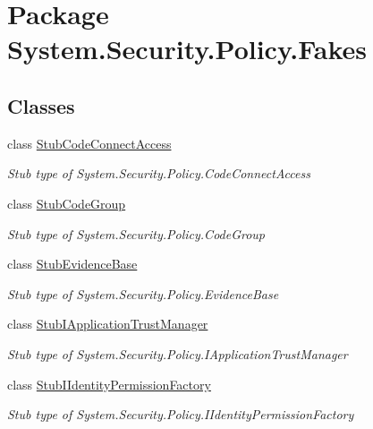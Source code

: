 \hypertarget{namespace_system_1_1_security_1_1_policy_1_1_fakes}{\section{Package System.\-Security.\-Policy.\-Fakes}
\label{namespace_system_1_1_security_1_1_policy_1_1_fakes}
}
\subsection*{Classes}
\begin{DoxyCompactItemize}
\item 
class \hyperlink{class_system_1_1_security_1_1_policy_1_1_fakes_1_1_stub_code_connect_access}{Stub\-Code\-Connect\-Access}
\begin{DoxyCompactList}\small\item\em Stub type of System.\-Security.\-Policy.\-Code\-Connect\-Access\end{DoxyCompactList}\item 
class \hyperlink{class_system_1_1_security_1_1_policy_1_1_fakes_1_1_stub_code_group}{Stub\-Code\-Group}
\begin{DoxyCompactList}\small\item\em Stub type of System.\-Security.\-Policy.\-Code\-Group\end{DoxyCompactList}\item 
class \hyperlink{class_system_1_1_security_1_1_policy_1_1_fakes_1_1_stub_evidence_base}{Stub\-Evidence\-Base}
\begin{DoxyCompactList}\small\item\em Stub type of System.\-Security.\-Policy.\-Evidence\-Base\end{DoxyCompactList}\item 
class \hyperlink{class_system_1_1_security_1_1_policy_1_1_fakes_1_1_stub_i_application_trust_manager}{Stub\-I\-Application\-Trust\-Manager}
\begin{DoxyCompactList}\small\item\em Stub type of System.\-Security.\-Policy.\-I\-Application\-Trust\-Manager\end{DoxyCompactList}\item 
class \hyperlink{class_system_1_1_security_1_1_policy_1_1_fakes_1_1_stub_i_identity_permission_factory}{Stub\-I\-Identity\-Permission\-Factory}
\begin{DoxyCompactList}\small\item\em Stub type of System.\-Security.\-Policy.\-I\-Identity\-Permission\-Factory\end{DoxyCompactList}\item 

\end{DoxyCompactItemize}
